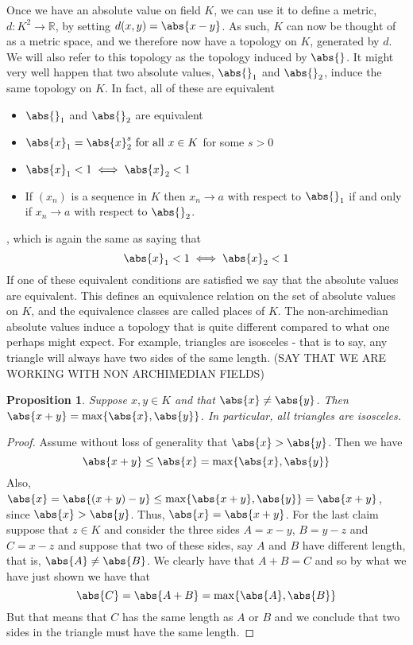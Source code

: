 \documentclass{article}
\newtheorem{proposition}{Proposition}[section]
\newcommand{\mbb}[1]{\mathbb{#1}}
\begin{document}



Once we have an absolute value on field $K$, we can use it to define a metric, $d : K^2 \to \mbb R$, by setting $d(x,y) = \abs{x - y}$. As such, $K$ can now be thought of as a metric space, and we therefore now have a topology on $K$, generated by $d$. We will also refer to this topology as the topology induced by $\abs{}$. It might very well happen that two absolute values, $\abs{}_1$ and $\abs{}_2$, induce the same topology on $K$. In fact, all of these are equivalent
\begin{itemize}
    \item $\abs{}_1$ and $\abs{}_2$ are equivalent
    \item $\abs{x}_1 = \abs{x}_2^s \text{ for all } x\in K$ for some $s > 0$
    \item $\abs{x}_1 < 1 \iff \abs{x}_2 < 1$
    \item If $(x_n)$ is a sequence in $K$ then $x_n \to a$ with respect to $\abs{}_1$ if and only if $x_n \to a$ with respect to $\abs{}_2$.
\end{itemize}
, which is again the same as saying that
$$\abs{x}_1 < 1 \iff \abs{x}_2 < 1$$
If one of these equivalent conditions are satisfied we say that the absolute values are equivalent. This defines an equivalence relation on the set of absolute values on $K$, and the equivalence classes are called places of $K$. The non-archimedian absolute values induce a topology that is quite different compared to what one perhaps might expect. For example, triangles are isosceles - that is to say, any triangle will always have two sides of the same length. 
(SAY THAT WE ARE WORKING WITH NON ARCHIMEDIAN FIELDS)
\begin{proposition}\label{prop: Triangles are isosceles}
    Suppose $x,y \in K$ and that $\abs{x} \neq \abs{y}$. Then $\abs{x + y} = \max \{\abs{x}, \abs{y}\}$. In particular, all triangles are isosceles.
\end{proposition}
\begin{proof}
    Assume without loss of generality that $\abs{x} > \abs{y}$. Then we have 
    $$\abs{x + y} \leq \abs{x} = \max \{\abs{x}, \abs{y}\}$$
    Also, $\abs{x} = \abs{(x + y) - y} \leq \max\{\abs{x + y}, \abs{y}\} = \abs{x + y}$, since $\abs{x} > \abs{y}$. Thus, $\abs{x} = \abs{x + y}$. For the last claim suppose that $z \in K$ and consider the three sides $A = x - y$, $B = y - z$ and $C = x-z$ and suppose that two of these sides, say $A$ and $B$ have different length, that is, $\abs{A} \neq \abs{B}$. We clearly have that $A + B = C$ and so by what we have just shown we have that
    $$\abs{C} = \abs{A + B} = \max\{\abs{A}, \abs{B}\}$$
    But that means that $C$ has the same length as $A$ or $B$ and we conclude that two sides in the triangle must have the same length.  
\end{proof}
\end{document}
